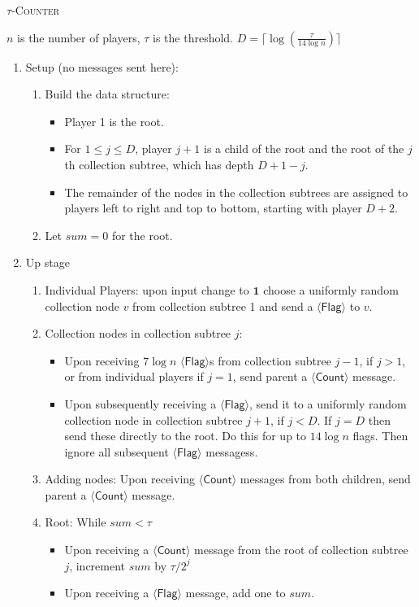 \documentclass[10pt]{llncs}
\newcommand{\dcl}{D}
\newcommand{\flag}{$\langle\mathsf{Flag}\rangle$\xspace}
\newcommand{\countm}{$\langle\mathsf{Count}\rangle$\xspace}
\newcommand{\tc}{\textsc{$\tau$-Counter}\xspace}
\begin{document}
\begin{algorithm}
\caption{\tc}
$n$ is the number of players,  $\tau$ is the threshold. 
$\dcl = \lceil \log(\frac{\tau}{14\log{n}})\rceil$
\begin{enumerate}
\item Setup (no messages sent here):
\begin{enumerate}
\item Build the data structure: 
\begin{itemize}
\item Player 1 is the root. 
\item For $1\le j \le \dcl$, player $j+1$ is a child of the root and 
the root of the $j$th collection subtree, which has depth $\dcl+1-j$. 
\item The remainder of the nodes in the collection subtrees are assigned to 
players
left to right and top to bottom, starting with player $\dcl+2$.
\end{itemize}
\item Let $sum = 0$ for the root.
\end{enumerate}
\item Up stage 
\begin{enumerate}
\item Individual Players: upon input change to $\mathbf{1}$ choose a 
uniformly random collection node $v$ from collection subtree 1 and
send a \flag to $v$.
\item Collection nodes in collection subtree $j$: 
\begin{itemize}
\item Upon receiving $7\log{n}$ {\flag}s from collection subtree $j-1$, 
if $j>1$, 
or from  individual players
if $j=1$, 
send parent a \countm message.
\item Upon subsequently receiving a \flag, send it to a uniformly random 
collection node  in collection subtree $j+1$, if $j<\dcl$.  
If $j=\dcl$ then send 
these directly to the root. Do this for up to $14 \log n$ 
flags. Then ignore all subsequent \flag messagess.
\end{itemize}     
\item Adding nodes: Upon receiving \countm  
messages from both children, send parent 
a \countm message.
\item Root:  While $sum < \tau$
\begin{itemize}
\item Upon receiving a \countm message from the root of collection subtree $j$,
increment $sum$ by $\tau/2^j$ 
\item Upon receiving a \flag message, add one to $sum$.

\end{itemize}
\end{enumerate}
\end{enumerate}
\end{algorithm}
\end{document}
